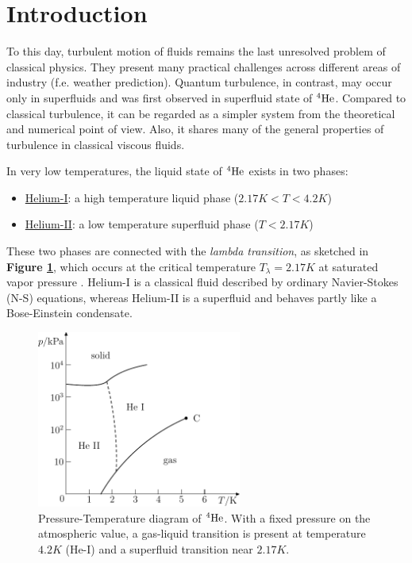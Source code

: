 \chapter*{Introduction}

	To this day, turbulent motion of fluids remains the last unresolved problem of classical physics. They present many practical challenges across different areas of industry (f.e. weather prediction). Quantum turbulence, in contrast, may occur only in superfluids and was first observed in superfluid state of ${}^4\mathrm{He}$. Compared to classical turbulence, it can be regarded as a simpler system from the theoretical and numerical point of view. Also, it shares many of the general properties of turbulence in classical viscous fluids.

	In very low temperatures, the liquid state of ${}^4\mathrm{He}$ exists in two phases:
	\begin{itemize}
		\item \underline{Helium-I}: a high temperature liquid phase ($2.17\unit{K}<T<4.2\unit{K}$)
		\item \underline{Helium-II}: a low temperature superfluid phase ($T<2.17\unit{K}$)
	\end{itemize}

	These two phases are connected with the \textit{lambda transition}, as sketched in \textbf{Figure \ref{phase_diag}}, which occurs at the critical temperature $T_{\lambda} = 2.17 \unit{K}$ at saturated vapor pressure . Helium-I is a classical fluid described by ordinary Navier-Stokes (N-S) equations, whereas Helium-II is a superfluid and behaves partly like a Bose-Einstein condensate.

	\begin{figure}[h]
		\centering
		\includegraphics[width=0.6\textwidth]{graphics/theory/phase_diag}
		\caption{Pressure-Temperature diagram of ${}^4\mathrm{He}$. With a fixed pressure on the atmospheric value, a gas-liquid transition is present at temperature $4.2\unit{K}$ (He-I) and a superfluid transition near $2.17\unit{K}$.}
		\label{phase_diag}
	\end{figure}

